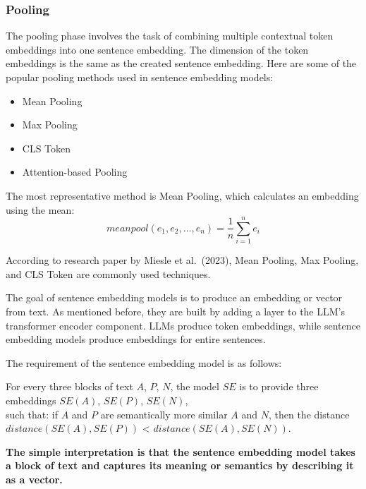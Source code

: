 \documentclass{wseas}
\begin{document}
    \subsubsection{Pooling}

The pooling phase involves the task of combining multiple contextual
token embeddings into one sentence embedding. The dimension of the token
embeddings is the same as the created sentence embedding. Here are some
of the popular pooling methods used in sentence embedding models:

\begin{itemize}

\item
  Mean Pooling
\item
  Max Pooling
\item
  CLS Token
\item
  Attention-based Pooling
\end{itemize}

The most representative method is Mean Pooling, which calculates an
embedding using the mean:
\begin{equation}
  meanpool(e_1, e_2, \ldots, e_n) = \frac{1}{n} \sum_{i=1}^{n} e_i
\end{equation}

According to research paper \cite{cite5} by Miesle et al.~(2023), Mean
Pooling, Max Pooling, and CLS Token are commonly used techniques.

The goal of sentence embedding models is to produce an embedding or
vector from text. As mentioned before, they are built by adding a layer
to the LLM's transformer encoder component. LLMs produce token
embeddings, while sentence embedding models produce embeddings for
entire sentences.

The requirement of the sentence embedding model is as follows:

For every three blocks of text \(A\), \(P\), \(N\), the model \(SE\) is
to provide three embeddings \(SE(A)\), \(SE(P)\), \(SE(N)\),\\
such that: if \(A\) and \(P\) are semantically more similar \(A\) and
\(N\), then the distance \(distance(SE(A), SE(P))\) \textless{}
\(distance(SE(A), SE(N))\).

\textbf{The simple interpretation is that the sentence embedding model
takes a block of text and captures its meaning or semantics by
describing it as a vector.}
\end{document}
